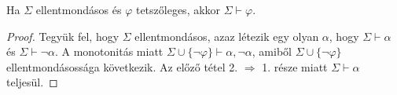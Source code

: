 \begin{theo} Ha $\Sigma$ ellentmondásos és $\varphi$ tetszőleges, akkor $\Sigma \vdash \varphi$.
\end{theo}
\begin{proof} Tegyük fel, hogy $\Sigma$ ellentmondásos, azaz létezik egy olyan $\alpha$, hogy $\Sigma \vdash \alpha$ és $\Sigma \vdash \lnot \alpha$. A monotonitás miatt $\Sigma \cup \lbrace \lnot \varphi \rbrace \vdash \alpha, \lnot \alpha$, amiből $\Sigma \cup \lbrace \lnot \varphi \rbrace$ ellentmondásossága következik. Az előző tétel 2. $\Rightarrow$ 1. része miatt $\Sigma \vdash \alpha$ teljesül.
\end{proof}